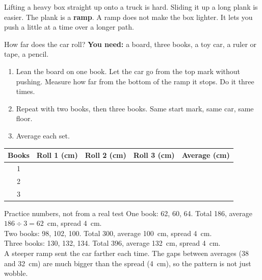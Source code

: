 \label{ch5}

Lifting a heavy box straight up onto a truck is hard. Sliding it up a long plank is easier. The plank is a \textbf{ramp}. A ramp does not make the box lighter. It lets you push a little at a time over a longer path.

\begin{center}
\end{center}

\begin{tryit}{How far does the car roll?}
\textbf{You need:} a board, three books, a toy car, a ruler or tape, a pencil.
\begin{enumerate}[leftmargin=1.6em]
\item Lean the board on one book. Let the car go from the top mark without pushing. Measure how far from the bottom of the ramp it stops. Do it three times.
\item Repeat with two books, then three books. Same start mark, same car, same floor.
\item Average each set.
\end{enumerate}
\par\medskip
\renewcommand{\arraystretch}{1.6}
\begin{tabular}{|c|c|c|c|c|}
\hline
\textbf{Books} & \textbf{Roll 1 (cm)} & \textbf{Roll 2 (cm)} & \textbf{Roll 3 (cm)} & \textbf{Average (cm)}\\ \hline
1 & & & & \\ \hline
2 & & & & \\ \hline
3 & & & & \\ \hline
\end{tabular}
\end{tryit}

\begin{worked}{Practice numbers, not from a real test}
One book: 62, 60, 64. Total 186, average $186\div3=62$~cm, spread 4~cm.\\
Two books: 98, 102, 100. Total 300, average 100~cm, spread 4~cm.\\
Three books: 130, 132, 134. Total 396, average 132~cm, spread 4~cm.\\
A steeper ramp sent the car farther each time. The gaps between averages (38 and 32~cm) are much bigger than the spread (4~cm), so the pattern is not just wobble.
\end{worked}

